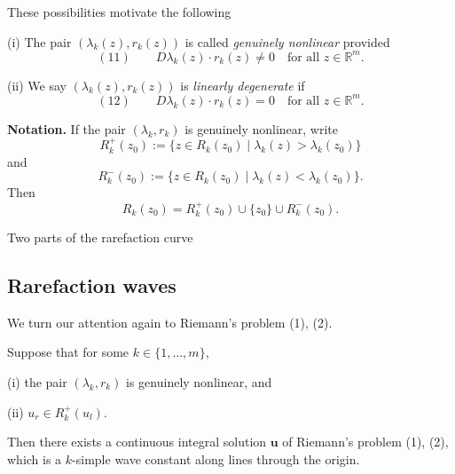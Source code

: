 These possibilities motivate the following

\begin{definition}
\label{def:genuinely-nonlinear-linearly-degenerate}
(i) The pair $(\lambda_k(z), r_k(z))$ is called \textit{genuinely nonlinear} provided
$$(11) \qquad D\lambda_k(z)\cdot r_k(z) \neq 0 \quad \text{for all } z\in\mathbb{R}^m.$$

(ii) We say $(\lambda_k(z), r_k(z))$ is \textit{linearly degenerate} if
$$(12) \qquad D\lambda_k(z)\cdot r_k(z) = 0 \quad \text{for all } z\in\mathbb{R}^m.$$
\end{definition}

\textbf{Notation.} If the pair $(\lambda_k, r_k)$ is genuinely nonlinear, write
$$R_k^+(z_0) := \{z\in R_k(z_0) \mid \lambda_k(z) > \lambda_k(z_0)\}$$
and
$$R_k^-(z_0) := \{z\in R_k(z_0) \mid \lambda_k(z) < \lambda_k(z_0)\}.$$
Then
$$R_k(z_0) = R_k^+(z_0) \cup \{z_0\} \cup R_k^-(z_0).$$

\begin{figure}[h]\centering
\end{figure}

Two parts of the rarefaction curve

\subsection{Rarefaction waves}\label{sec:rarefaction-waves}

We turn our attention again to Riemann's problem (1), (2).

\begin{theorem}
\label{thm:existence-k-rarefaction-waves}
Suppose that for some $k\in\{1,\ldots,m\}$,

(i) the pair $(\lambda_k, r_k)$ is genuinely nonlinear, and

(ii) $u_r \in R_k^+(u_l)$.

Then there exists a continuous integral solution $\mathbf{u}$ of Riemann's problem (1), (2), which is a $k$-simple wave constant along lines through the origin.
\end{theorem}

